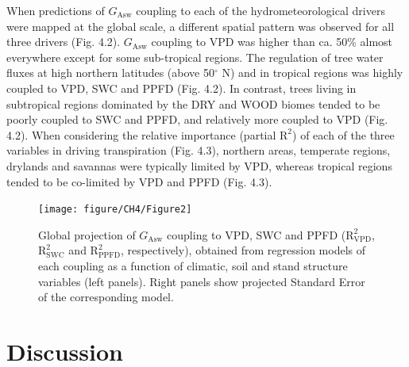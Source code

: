\documentclass[11pt,twoside]{reedthesis}
\begin{document}
When predictions of \(G_{\text{Asw}}\) coupling to each of the
hydrometeorological drivers were mapped at the global scale, a different
spatial pattern was observed for all three drivers (Fig. 4.2).
\(G_{\text{Asw}}\) coupling to VPD was higher than ca. 50\% almost
everywhere except for some sub-tropical regions. The regulation of tree
water fluxes at high northern latitudes (above 50\(^{\circ}\) N) and in
tropical regions was highly coupled to VPD, SWC and PPFD (Fig. 4.2). In
contrast, trees living in subtropical regions dominated by the DRY and
WOOD biomes tended to be poorly coupled to SWC and PPFD, and relatively
more coupled to VPD (Fig. 4.2). When considering the relative importance
(partial \(\text{R}^2\)) of each of the three variables in driving
transpiration (Fig. 4.3), northern areas, temperate regions, drylands
and savannas were typically limited by VPD, whereas tropical regions
tended to be co-limited by VPD and PPFD (Fig. 4.3).\par
\begin{figure}[hbt!]

{\centering \texttt{[image: figure/CH4/Figure2]} 

}

\caption[Global projection of $G_{\text{Asw}}$ coupling to VPD, SWC and PPFD.]{Global projection of $G_{\text{Asw}}$ coupling to VPD, SWC and PPFD ($\text{R}^2_{\text{VPD}}$, $\text{R}^2_{\text{SWC}}$ and $\text{R}^2_{\text{PPFD}}$, respectively), obtained from regression models of each coupling as a function of climatic, soil and stand structure variables (left panels). Right panels show projected Standard Error of the corresponding model.}\label{fig:ch4fig2}
\end{figure}
\section{Discussion}\label{discussion}
\end{document}
